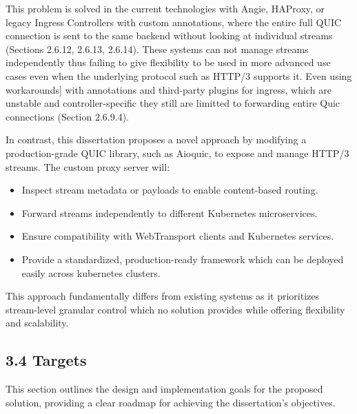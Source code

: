 {This problem is solved in the current technologies with Angie, HAProxy, or legacy Ingress Controllers with custom annotations, where the entire full QUIC connection is sent to the same backend without looking at individual streams (Sections 2.6.12, 2.6.13, 2.6.14). These systems can not manage streams independently thus failing to give flexibility to be used in more advanced use cases even when the underlying protocol such as HTTP/3 supports it. Even using workarounds] with annotations and third-party plugins for ingress, which are unstable and controller-specific they still are limitted to forwarding entire Quic connections (Section 2.6.9.4).

In contrast, this dissertation proposes a novel approach by modifying a production-grade QUIC library, such as Aioquic, to expose and manage HTTP/3 streams. The custom proxy server will:

\begin{itemize}
    \item Inspect stream metadata or payloads to enable content-based routing.
    \item Forward streams independently to different Kubernetes microservices.
    \item Ensure compatibility with WebTransport clients and Kubernetes services.
    \item Provide a standardized, production-ready framework which can be deployed easily across kubernetes clusters.
\end{itemize}
This approach fundamentally differs from existing systems as it prioritizes stream-level granular control which no solution provides while offering flexibility and scalability.

\subsection*{3.4 Targets}
This section outlines the design and implementation goals for the proposed solution, providing a clear roadmap for achieving the dissertation’s objectives.

}
